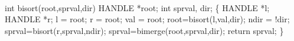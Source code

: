 {\tt
\begin{program}{0}
 int bisort(root,sprval,dir) 
{} HANDLE *root;
 int sprval, dir;
\{
	HANDLE *l;
	HANDLE *r;
	 l = root;
      r = root;
      val = root;
     root=bisort(l,val,dir);
      ndir = !dir;
      sprval=bisort(r,sprval,ndir);
      sprval=bimerge(root,sprval,dir);
    return sprval;
 \} 
  \end{program}
  }
